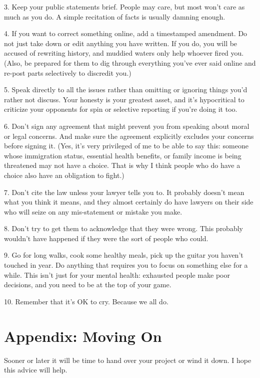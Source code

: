 \documentclass[10pt,letterpaper]{article}
\begin{document}
3. Keep your public statements brief.
   People may care, but most won't care as much as you do.  A simple recitation of
   facts is usually damning enough.

4. If you want to correct something online, add a timestamped amendment.
   Do not just take down or edit anything you have written.  If you do, you will be
   accused of rewriting history, and muddied waters only help whoever fired you.
   (Also, be prepared for them to dig through everything you've ever said online
   and re-post parts selectively to discredit you.)

5. Speak directly to all the issues rather than omitting or ignoring things you'd rather not discuss.
   Your honesty is your greatest asset, and it's hypocritical to criticize your
   opponents for spin or selective reporting if you're doing it too.

6. Don't sign any agreement that might prevent you from speaking about moral or legal concerns.
   And make sure the agreement explicitly excludes your concerns before signing it.
   (Yes, it's very privileged of me to be able to say this: someone whose
   immigration status, essential health benefits, or family income is being
   threatened may not have a choice.  That is why I think people who do have a
   choice also have an obligation to fight.)

7. Don't cite the law unless your lawyer tells you to.
   It probably doesn't mean what you think it means, and they almost certainly do
   have lawyers on their side who will seize on any mis-statement or mistake you
   make.

8. Don't try to get them to acknowledge that they were wrong.
   This probably wouldn't have happened if they were the sort of people who could.

9. Go for long walks, cook some healthy meals, pick up the guitar you haven't touched in year.
   Do anything that requires you to focus on something else for a while.  This
   isn't just for your mental health: exhausted people make poor decisions, and you
   need to be at the top of your game.

10. Remember that it's OK to cry.
    Because we all do.

\section*{Appendix: Moving On}

Sooner or later it will be time to hand over your project or wind it down.
I hope this advice will help.
\end{document}
